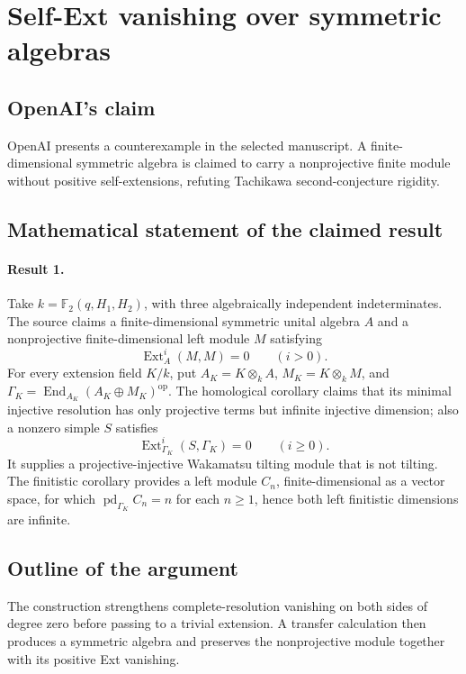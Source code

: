 \documentclass[11pt]{article}
\begin{document}
\section*{Self-Ext vanishing over symmetric algebras}

\subsection{OpenAI's claim}
OpenAI presents a counterexample in the selected manuscript. A finite-dimensional symmetric algebra is claimed to carry a nonprojective finite module without positive self-extensions, refuting Tachikawa second-conjecture rigidity.

\subsection{Mathematical statement of the claimed result}
\paragraph{Result 1.} Take \(k=\mathbb F_2(q,H_1,H_2)\), with three algebraically independent indeterminates. The source claims a finite-dimensional symmetric unital algebra \(A\) and a nonprojective finite-dimensional left module \(M\) satisfying
\[
 \operatorname{Ext}^i_A(M,M)=0\qquad(i>0).
\]
For every extension field \(K/k\), put \(A_K=K\otimes_kA\), \(M_K=K\otimes_kM\), and \(\Gamma_K=\operatorname{End}_{A_K}(A_K\oplus M_K)^{\mathrm{op}}\). The homological corollary claims that its minimal injective resolution has only projective terms but infinite injective dimension; also a nonzero simple \(S\) satisfies
\[
 \operatorname{Ext}^i_{\Gamma_K}(S,\Gamma_K)=0\qquad(i\ge0).
\]
It supplies a projective-injective Wakamatsu tilting module that is not tilting. The finitistic corollary provides a left module \(C_n\), finite-dimensional as a vector space, for which \(\operatorname{pd}_{\Gamma_K}C_n=n\) for each \(n\ge1\), hence both left finitistic dimensions are infinite.

\subsection{Outline of the argument}
The construction strengthens complete-resolution vanishing on both sides of degree zero before passing to a trivial extension. A transfer calculation then produces a symmetric algebra and preserves the nonprojective module together with its positive Ext vanishing.
\end{document}
